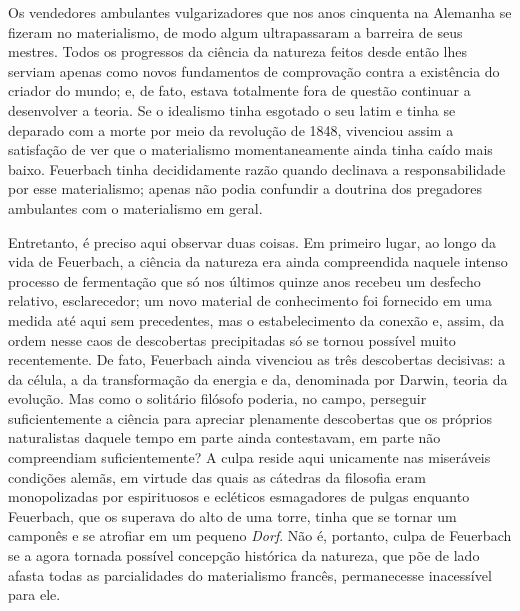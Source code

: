 Os vendedores ambulantes vulgarizadores que nos anos cinquenta na %
Alemanha se fizeram no materialismo, de modo algum ultrapassaram a
barreira de seus mestres. Todos os progressos da ciência da natureza
feitos desde então lhes serviam apenas como novos fundamentos de
comprovação contra a existência do criador do mundo; e, de fato, estava
totalmente fora de questão continuar a desenvolver a teoria. Se o
idealismo tinha esgotado o seu latim e tinha se deparado com a morte por %
meio da revolução de 1848, vivenciou assim a satisfação de ver que o
materialismo momentaneamente ainda tinha caído mais %
baixo. Feuerbach tinha
decididamente razão quando declinava a responsabilidade por esse
materialismo; apenas não podia confundir a doutrina dos pregadores %
ambulantes com o materialismo em geral.

Entretanto, é preciso aqui observar duas coisas. Em primeiro lugar, ao
longo da vida
de Feuerbach,
a ciência da natureza era ainda compreendida naquele intenso processo de
fermentação que só nos últimos quinze anos recebeu um desfecho relativo, %
esclarecedor; um novo material de conhecimento foi fornecido em uma
medida até aqui sem precedentes, mas o estabelecimento
da conexão e, assim, da ordem nesse caos de 
descobertas precipitadas só se tornou possível muito recentemente. De
fato,
 Feuerbach ainda
vivenciou as três descobertas decisivas: a da célula, a da
transformação da energia e da, denominada %
por Darwin,
teoria da evolução. Mas como o solitário
filósofo poderia, no campo, perseguir suficientemente a ciência para %
apreciar plenamente descobertas que os próprios naturalistas daquele
tempo em parte ainda contestavam, em parte não compreendiam %
suficientemente? A culpa reside aqui unicamente nas miseráveis condições
alemãs, em virtude das quais as cátedras da filosofia eram monopolizadas %
por espirituosos e ecléticos esmagadores de pulgas
enquanto Feuerbach,
que os superava do alto de uma torre, tinha que se tornar um camponês e
se atrofiar em um pequeno \emph{Dorf}. Não é, portanto, culpa %
de Feuerbach
se a agora tornada possível concepção histórica da natureza, que põe de %
lado \textbar{} afasta \textbar{} todas as parcialidades do materialismo francês,
permanecesse inacessível para ele.

